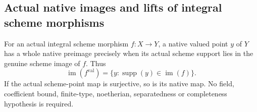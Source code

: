 \subsection{Actual native images and lifts of integral scheme morphisms}
\label{subsec:native-integral-images}

\begin{theorem}
\label{scheme:integral-native-image}
\leanok
{}
For an actual integral scheme morphism $f:X\to Y$, a native valued point
$y$ of $Y$ has a whole native preimage precisely when its actual scheme
support lies in the genuine scheme image of $f$. Thus
\[
 \operatorname{im}(f^{\mathrm{val}})
 =\{y:\operatorname{supp}(y)\in\operatorname{im}(f)\}.
\]
If the actual scheme-point map is surjective, so is its native map.
No field, coefficient bound, finite-type, noetherian, separatedness or
completeness hypothesis is required.
\end{theorem}
